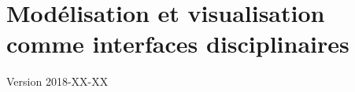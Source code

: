 \documentclass[12pt, a4paper, oneside]{book}
\begin{document}
	\setcounter{part}{-1}
	\setcounter{chapter}{0}
	\setcounter{secnumdepth}{4}
		
	\chapter{Modélisation et visualisation comme interfaces disciplinaires}
	\begin{center}
		{\large Version 2018-XX-XX}
	\end{center}

	
\end{document}
